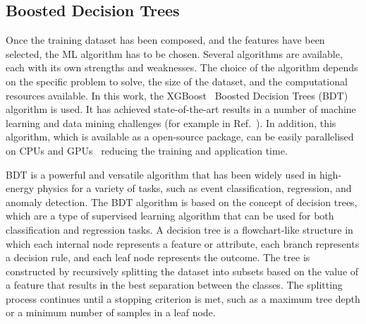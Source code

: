 \subsection{Boosted Decision Trees}
Once the training dataset has been composed, and the features have been selected, the ML algorithm has to be chosen. Several algorithms are available, each with its own strengths and weaknesses. The choice of the algorithm depends on the specific problem to solve, the size of the dataset, and the computational resources available. In this work, the XGBoost~\cite{DBLP:xgboost} Boosted Decision Trees (BDT) algorithm is used. It has achieved state-of-the-art results in a number of machine learning and data mining challenges (for example in Ref.~\cite{kaggle:higgs}). In addition, this algorithm, which is available as a open-source package, can be easily parallelised on CPUs and GPUs~\cite{mitchell2017accelerating} reducing the training and application time.

BDT is a powerful and versatile algorithm that has been widely used in high-energy physics for a variety of tasks, such as event classification, regression, and anomaly detection. The BDT algorithm is based on the concept of decision trees, which are a type of supervised learning algorithm that can be used for both classification and regression tasks. A decision tree is a flowchart-like structure in which each internal node represents a feature or attribute, each branch represents a decision rule, and each leaf node represents the outcome. The tree is constructed by recursively splitting the dataset into subsets based on the value of a feature that results in the best separation between the classes. The splitting process continues until a stopping criterion is met, such as a maximum tree depth or a minimum number of samples in a leaf node.
